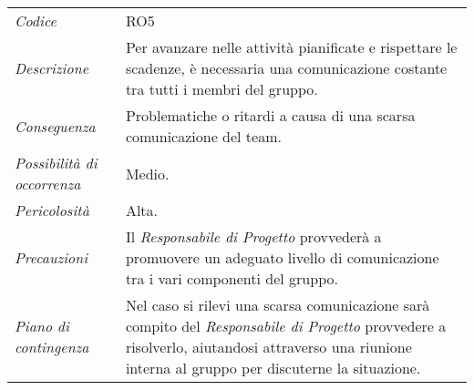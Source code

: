 {{{{{{{{{	\begin{center}
		\renewcommand{\arraystretch}{1.4}
		\begin{longtable}{|p{5cm}|p{12cm}|}
			\hline
			\rowcolor{airforceblue}
			\multicolumn{2}{|c|}{\textit{Scarsa comunicazione}}\\
			\hline
			\textit{Codice} & RO5 \\
			\hline
			\textit{Descrizione} & Per avanzare nelle attività pianificate e rispettare le scadenze, è necessaria una comunicazione costante tra tutti i membri del gruppo.\\
			\hline
			\textit{Conseguenza} & Problematiche o ritardi a causa di una scarsa comunicazione del team. \\
			\hline
			\textit{Possibilità di occorrenza} & Medio. \\
			\hline
			\textit{Pericolosità} & Alta. \\
			\hline
			\textit{Precauzioni} & Il \textit{Responsabile di Progetto} provvederà a promuovere un adeguato livello di comunicazione tra i vari componenti del gruppo.  \\
			\hline
			\textit{Piano di contingenza} & Nel caso si rilevi una scarsa comunicazione sarà compito del \textit{Responsabile di Progetto} provvedere a risolverlo, aiutandosi attraverso una riunione interna al gruppo per discuterne la situazione. \\
			\hline
		\end{longtable}
	\end{center}


\def\tabularxcolumn#1{m{#1}}
{
	
}}}}}}}}}}
